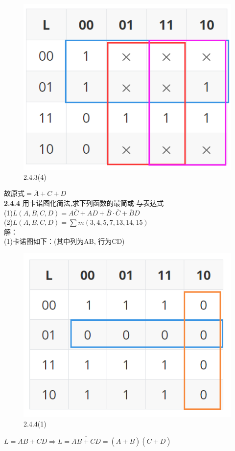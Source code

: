 \documentclass[a4paper,11pt,UTF8]{article}
\begin{document}
\begin{figure}[H] 
	\centering 
	\includegraphics[scale=0.30]{SD2.4.3_4.png}
	\caption{2.4.3(4)}
\end{figure}
故原式$=\overline{A}+C+D$\\
\textbf{2.4.4} 用卡诺图化简法,求下列函数的最简或-与表达式\\
(1)$
L(A,B,C,D)=A\overline{C}+AD+\overline{B}\cdot\overline{C}+\overline{B}D
$\\
(2)$
L(A,B,C,D)=\sum m(3,4,5,7,13,14,15)
$\\
解：\\
(1)卡诺图如下：(其中列为AB, 行为CD)
\begin{figure}[H] 
	\centering 
	\includegraphics[scale=0.30]{SD2.4.4_1.png}
	\caption{2.4.4(1)}
\end{figure}
$\overline{L}=\overline{A}B+C\overline{D}\Rightarrow L=\overline{\overline{A}B+C\overline{D}}=(A+\overline{B})(\overline{C}+D)$\\
\end{document}
